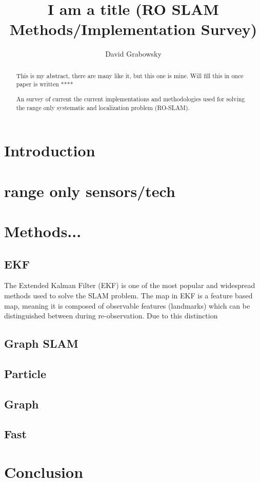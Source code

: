 \documentclass[conference]{IEEEtran}
\begin{document}
	\title{I am a title (RO SLAM Methods/Implementation Survey) }

	\author{David Grabowsky}
	
	
	
	
	\maketitle
	
	
\begin{abstract}

	
	This is my abstract, there are many like it, but this one is mine. Will fill this in once paper is written ****
	
	An survey of current the current implementations and methodologies used for solving the range only systematic and localization problem (RO-SLAM). 

\end{abstract}
	
	
	
\section{Introduction} 

\section{range only sensors/tech}
\section{Methods...}
\subsection{EKF}
The Extended Kalman Filter (EKF) is one of the most popular and widespread methods used to solve the SLAM problem. The map in EKF is a feature based map, meaning it is composed of observable features (landmarks) which can be distinguished between during re-observation.  
Due to this distinction 

\cite{Blanco2008}

\subsection{Graph SLAM}
\subsection{Particle}
\subsection{Graph}
\subsection{Fast}

\section{Conclusion}


	
	
	
\end{document}

